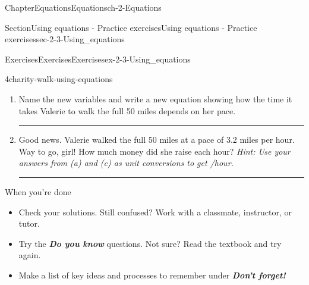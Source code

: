 \documentclass[twoside,11pt,]{book}
\newcommand{\alert}[1]{\textbf{\textit{#1}}}
\newlength{\workspacestrutwidth}
\numberwithin{equation}{section}
\newcommand{\amp}{&}
\begin{document}
\begin{chapterptx}{Chapter}{Equations}{}{Equations}{}{}{ch-2-Equations}
\begin{sectionptx}{Section}{Using equations - Practice exercises}{}{Using equations - Practice exercises}{}{}{sec-2-3-Using_equations}
\begin{exercises-subsection-numberless}{Exercises}{Exercises}{}{Exercises}{}{}{ex-2-3-Using_equations}
\begin{divisionexercise}{4}{}{}{charity-walk-using-equations}
\begin{enumerate}[label=(\alph*),ref=\alph*]
\item{}Name the new variables and write a new equation showing how the time it takes Valerie to walk the full 50 miles depends on her pace.%
\par
    \hspace{-2cm}
%
%
\par\rule{\workspacestrutwidth}{1.75cm}%
\item{}Good news. Valerie walked the full 50 miles at a pace of 3.2 miles per hour. Way to go, girl! How much money did she raise each hour? \emph{Hint: Use your answers from (a) and (c) as unit conversions to get \textdollar{}\slash{}hour.}%
\par\rule{\workspacestrutwidth}{1.75cm}%
\end{enumerate}%
\end{divisionexercise}%
\end{exercises-subsection-numberless}
\begin{conclusion}{When you're done \textellipsis{}}%
%
\begin{itemize}[label=\textbullet]
\item{}Check your solutions. Still confused? Work with a classmate, instructor, or tutor.%
\item{}Try the \alert{Do you know} questions. Not sure? Read the textbook and try again.%
\item{}Make a list of key ideas and processes to remember under \alert{Don't forget!}%

\end{itemize}
\end{conclusion}
\end{sectionptx}
\end{chapterptx}
\end{document}
